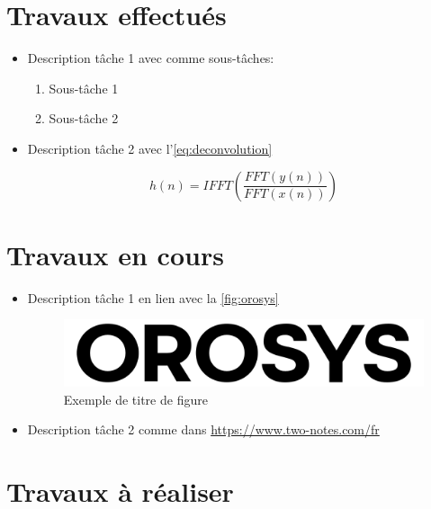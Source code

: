 \documentclass[12pt, a4paper]{article}
\begin{document}
\section{Travaux effectués}

\begin{itemize}
\item Description tâche 1 avec comme sous-tâches:
	\begin{enumerate}
	\item Sous-tâche 1
	\item Sous-tâche 2	
	\end{enumerate}
\item Description tâche 2 avec l'\autoref{eq:deconvolution}

\begin{equation}
    \label{eq:deconvolution}
    h(n) = IFFT \left( \frac{FFT(y(n))}{FFT(x(n))} \right)
\end{equation}

\end{itemize}

\section{Travaux en cours}

\begin{itemize}
\item Description tâche 1 en lien avec la \autoref{fig:orosys}

\begin{figure}[h!]
\centering
\includegraphics[width=\linewidth]{orosys.png}
\caption{Exemple de titre de figure}
\label{fig:orosys}
\end{figure}

\item Description tâche 2 comme dans \url{https://www.two-notes.com/fr}

\end{itemize}

\section{Travaux à réaliser}
\end{document}
